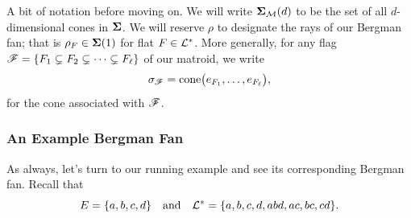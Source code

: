 \documentclass[12pt,oneside]{../../sfsuthesis}
\begin{document}
A bit of notation before moving on.
We will write \( \bm{\Sigma}_{\mathcal{M}}(d) \) to be the set of all \( d \)-dimensional cones in \( \bm{\Sigma} \).
We will reserve \( \rho \) to designate the rays of our Bergman fan; that is \( \rho_F \in \bm{\Sigma}(1) \) for flat \( F \in \mathcal{L}^\ast \).
More generally, for any flag \( \mathscr{F} = \{ F_1 \subsetneq F_2 \subsetneq \cdots \subsetneq F_\ell \} \) of our matroid, we write
\[
    \sigma_{\mathscr{F}} = \mathrm{cone}\bigl( e_{F_1}, \dots, e_{F_\ell} \bigr),
\]
for the cone  associated with \(\mathscr{F}\).

\subsubsection{An Example Bergman Fan}
As always, let's turn to our running example and see its corresponding Bergman fan.
Recall that
\[
    E = \{ a, b, c, d \} \quad \text{and} \quad \mathcal{L}^\ast = \{ a, b, c, d, abd, ac, bc, cd \}.
\]
\end{document}
